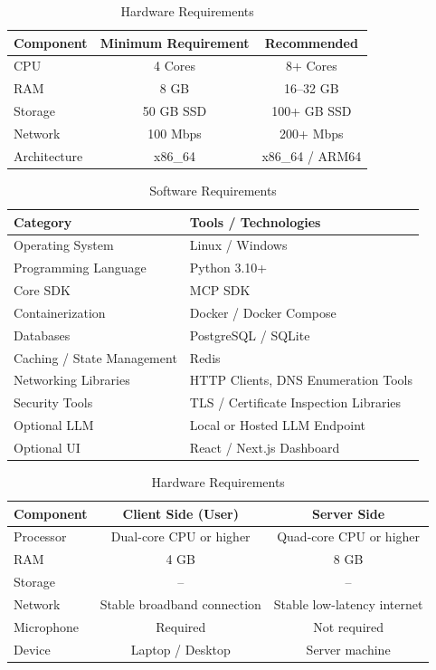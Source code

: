 \begin{table}[h]
\centering
\caption{Hardware Requirements}
\label{tab:hardware_requirements}
\begin{tabular}{|l|c|c|}
\hline
\textbf{Component} & \textbf{Minimum Requirement} & \textbf{Recommended} \\
\hline
CPU & 4 Cores & 8+ Cores \\
RAM & 8 GB & 16--32 GB \\
Storage & 50 GB SSD & 100+ GB SSD \\
Network & 100 Mbps & 200+ Mbps \\
Architecture & x86\_64 & x86\_64 / ARM64 \\
\hline
\end{tabular}
\end{table}

\begin{table}[h]
\centering
\caption{Software Requirements}
\label{tab:software_requirements}
\begin{tabular}{|l|l|}
\hline
\textbf{Category} & \textbf{Tools / Technologies} \\
\hline
Operating System & Linux / Windows \\
Programming Language & Python 3.10+ \\
Core SDK & MCP SDK \\
Containerization & Docker / Docker Compose \\
Databases & PostgreSQL / SQLite \\
Caching / State Management & Redis \\
Networking Libraries & HTTP Clients, DNS Enumeration Tools \\
Security Tools & TLS / Certificate Inspection Libraries \\
Optional LLM & Local or Hosted LLM Endpoint \\
Optional UI & React / Next.js Dashboard \\
\hline
\end{tabular}
\end{table}

\begin{table}[h]
\centering
\caption{ Hardware Requirements}
\label{tab:min_hardware_client_server}
\begin{tabular}{|l|c|c|}
\hline
\textbf{Component} & \textbf{Client Side (User)} & \textbf{Server Side} \\
\hline
Processor & Dual-core CPU or higher & Quad-core CPU or higher \\
RAM & 4 GB & 8 GB \\
Storage & -- & -- \\
Network & Stable broadband connection & Stable low-latency internet \\
Microphone & Required & Not required \\
Device & Laptop / Desktop & Server machine \\
\hline
\end{tabular}
\end{table}


